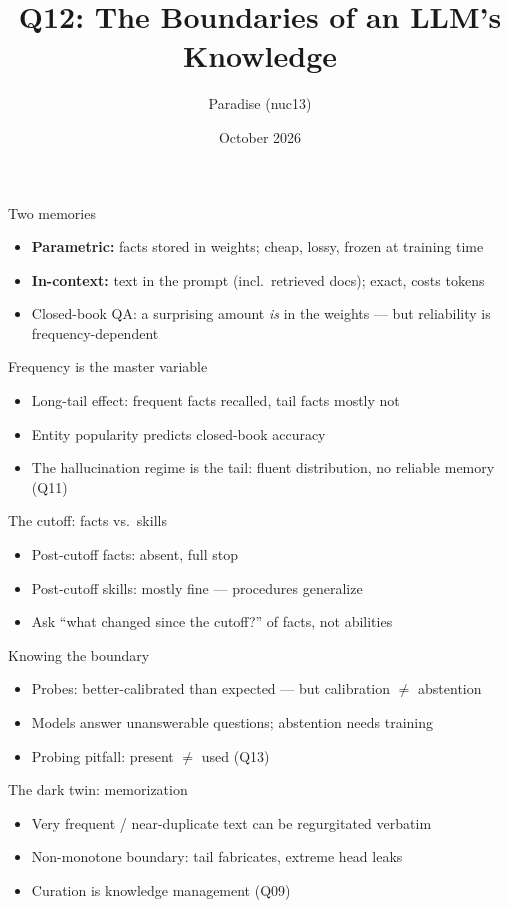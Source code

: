\documentclass[aspectratio=169,11pt]{beamer}
\title{Q12: The Boundaries of an LLM's Knowledge}
\author{Paradise (nuc13)}
\date{October 2026}
\begin{document}
\frame{\titlepage}
\begin{frame}{Two memories}
\begin{itemize}
\item \textbf{Parametric:} facts stored in weights; cheap, lossy, frozen at training time
\item \textbf{In-context:} text in the prompt (incl.\ retrieved docs); exact, costs tokens
\item Closed-book QA: a surprising amount \emph{is} in the weights \cite{roberts2020closedbook} --- but reliability is frequency-dependent
\end{itemize}
\end{frame}
\begin{frame}{Frequency is the master variable}
\begin{itemize}
\item Long-tail effect: frequent facts recalled, tail facts mostly not \cite{kandpal2023longtail}
\item Entity popularity predicts closed-book accuracy \cite{mallen2023popqa}
\item The hallucination regime is the tail: fluent distribution, no reliable memory (Q11)
\end{itemize}
\end{frame}
\begin{frame}{The cutoff: facts vs.\ skills}
\begin{itemize}
\item Post-cutoff facts: absent, full stop
\item Post-cutoff skills: mostly fine --- procedures generalize \cite{lazaridou2021mindgap}
\item Ask ``what changed since the cutoff?'' of facts, not abilities
\end{itemize}
\end{frame}
\begin{frame}{Knowing the boundary}
\begin{itemize}
\item Probes: better-calibrated than expected \cite{kadavath2022know} --- but calibration $\neq$ abstention
\item Models answer unanswerable questions; abstention needs training \cite{yin2023dontknow}
\item Probing pitfall: present $\neq$ used (Q13)
\end{itemize}
\end{frame}
\begin{frame}{The dark twin: memorization}
\begin{itemize}
\item Very frequent / near-duplicate text can be regurgitated verbatim \cite{carlini2021extracting}
\item Non-monotone boundary: tail fabricates, extreme head leaks
\item Curation is knowledge management (Q09)
\end{itemize}
\end{frame}
\end{document}
